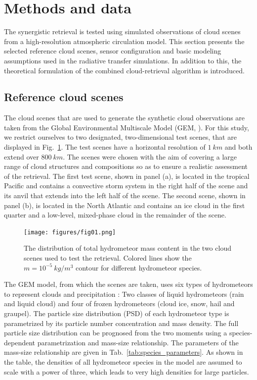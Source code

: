 \documentclass[journal abbreviation, manuscript]{copernicus}
\begin{document}
\section{Methods and data}
\label{sec:methods_and_data}

The synergistic retrieval is tested using simulated observations of cloud scenes
from a high-resolution atmospheric circulation model. This section presents the
selected reference cloud scenes, sensor configuration and basic modeling
assumptions used in the radiative transfer simulations. In addition to this, the
theoretical formulation of the combined cloud-retrieval algorithm is introduced.

\subsection{Reference cloud scenes}

The cloud scenes that are used to generate the synthetic cloud observations are
taken from the Global Environmental Multiscale Model (GEM, \cite{cote98}). For
this study, we restrict ourselves to two designated, two-dimensional test
scenes, that are displayed in Fig.~\ref{fig:overview}. The test scenes have a
horizontal resolution of $1\ \unit{km}$ and both extend over $800\ \unit{km}$.
The scenes were chosen with the aim of covering a large range of cloud
structures and compositions so as to ensure a realistic assessment of the
retrieval. The first test scene, shown in panel (a), is located in the tropical
Pacific and contains a convective storm system in the right half of the scene
and its anvil that extends into the left half of the scene. The second scene,
shown in panel (b), is located in the North Atlantic and contains an  ice
cloud in the first quarter and a low-level, mixed-phase cloud in the remainder
of the scene.

\begin{figure}[h!]
\centering
\texttt{[image: figures/fig01.png]}
\caption{The distribution of total hydrometeor mass content in the two
cloud scenes used to test the retrieval. Colored lines show the
 $m = 10^{-5}\  \unit{kg/m^3}$ contour for different
 hydrometeor species.}
\label{fig:overview}
\end{figure}


The GEM model, from which the scenes are taken, uses six types of hydrometeors
to represent clouds and precipitation \citep{milbrandtyau05}: Two classes of
liquid hydrometeors (rain and liquid cloud) and four of frozen hydrometeors
(cloud ice, snow, hail and graupel). The particle size distribution (PSD) of
each hydrometeor type is parametrized by its particle number concentration and
mass density. The full particle size distribution can be prognosed from the two
moments using a species-dependent parametrization and mass-size relationship.
The parameters of the mass-size relationship are given in
Tab.~\ref{tab:species_parameters}. As shown in the table, the densities of all
hydrometeor species in the model are assumed to scale with a power of three,
which leads to very high densities for large particles.
\end{document}
